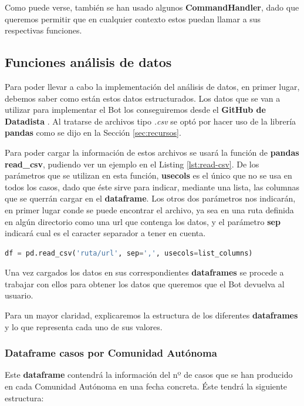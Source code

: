 Como puede verse, también se han usado algunos \textbf{CommandHandler}, dado que queremos permitir que en cualquier contexto estos puedan llamar a sus respectivas funciones.

\subsection{Funciones análisis de datos}

Para poder llevar a cabo la implementación del análisis de datos, en primer lugar, debemos saber como están estos datos estructurados. Los datos que se van a utilizar para implementar el Bot los conseguiremos desde el \textbf{GitHub de Datadista} \cite{github-datadista}. Al tratarse de archivos tipo \textit{.csv} se optó por hacer uso de la librería \textbf{pandas} como se dijo en la Sección \ref{sec:recursos}.

Para poder cargar la información de estos archivos se usará la función de \textbf{pandas} \textbf{read\_csv}, pudiendo ver un ejemplo en el Listing \ref{lst:read-csv}. De los parámetros que se utilizan en esta función, \textbf{usecols} es el único que no se usa en todos los casos, dado que éste sirve para indicar, mediante una lista, las columnas que se querrán cargar en el \textbf{dataframe}. Los otros dos parámetros nos indicarán, en primer lugar conde se puede encontrar el archivo, ya sea en una ruta definida en algún directorio como una url que contenga los datos, y el parámetro \textbf{sep} indicará cual es el caracter separador a tener en cuenta.

\begin{lstlisting}[language=Python, caption={Función read\_csv.}, label={lst:read-csv}]
df = pd.read_csv('ruta/url', sep=',', usecols=list_columns)
\end{lstlisting}

Una vez cargados los datos en sus correspondientes \textbf{dataframes} se procede a trabajar con ellos para obtener los datos que queremos que el Bot devuelva al usuario.

Para un mayor claridad, explicaremos la estructura de los diferentes \textbf{dataframes} y lo que representa cada uno de sus valores.

\subsubsection{Dataframe casos por Comunidad Autónoma}

Este \textbf{dataframe} contendrá la información del nº de casos que se han producido en cada Comunidad Autónoma en una fecha concreta. Éste tendrá la siguiente estructura:


